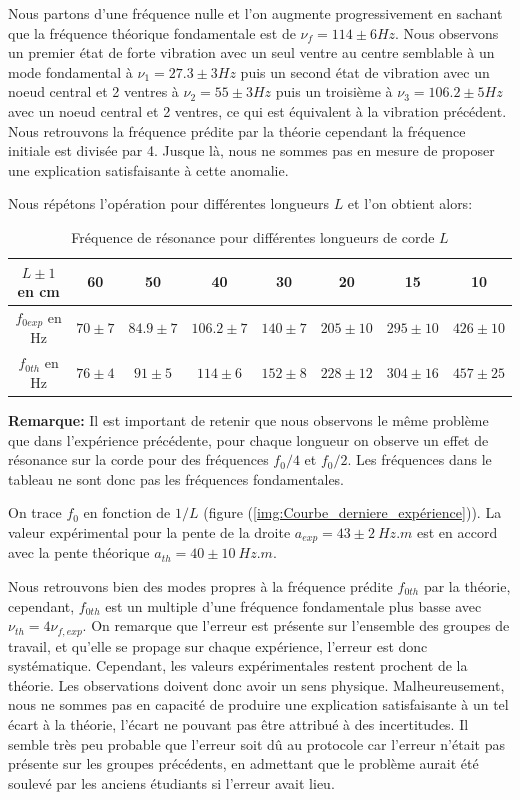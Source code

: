 \documentclass[11pt]{article}
\begin{document}
Nous partons d'une fréquence nulle et l'on augmente progressivement en sachant que la fréquence théorique fondamentale est de $\nu_f = 114 \pm 6 Hz$.
Nous observons un premier état de forte vibration avec un seul ventre au centre semblable à un mode fondamental à $\nu_1 = 27.3 \pm 3 Hz$ puis un second état 
de vibration avec un noeud central et 2 ventres à $\nu_2 = 55 \pm 3 Hz$ puis un troisième à $\nu_3 = 106.2 \pm 5Hz$ avec un noeud central et 2 ventres, ce qui est équivalent à la vibration
précédent. Nous retrouvons la fréquence prédite par la théorie cependant la fréquence initiale est divisée par 4. Jusque là, nous ne sommes pas en mesure de proposer une explication
satisfaisante à cette anomalie.

Nous répétons l'opération pour différentes longueurs $L$ et l'on obtient alors:

\begin{table}[h!]
	\centering
	\begin{tabular}{||c c c c c c c c||} 
		\hline
		$L \pm 1$ en cm & 60 & 50 & 40 & 30 & 20 & 15 & 10 \\
		\hline
        $f_{0exp}$ en Hz & $70 \pm 7$ & $84.9 \pm 7$ & $106.2 \pm 7$ & $140 \pm 7$ & $205 \pm 10$ & $295 \pm 10$ & $426 \pm 10$ \\
        $f_{0th}$ en Hz & $76 \pm 4$ & $91 \pm 5$ & $114 \pm 6$ & $152 \pm 8$ & $228 \pm 12$ & $304 \pm 16$ & $457 \pm 25$ \\
		\hline
	\end{tabular}
	\caption{Fréquence de résonance pour différentes longueurs de corde $L$}
	\label{table:2}
\end{table}

\textbf{Remarque:} Il est important de retenir que nous observons le même problème que dans l'expérience précédente, pour chaque longueur on observe un effet de résonance sur la corde
pour des fréquences $f_0/4$ et $f_0 / 2$. Les fréquences dans le tableau ne sont donc pas les fréquences fondamentales.

On trace $f_0$ en fonction de $1/L$ (figure (\ref{img:Courbe_derniere_expérience})). 
La valeur expérimental pour la pente de la droite $a_{exp}=43 \pm 2 \ Hz.m$ est en accord avec la pente théorique $a_{th}=40 \pm 10 \ Hz.m$.

Nous retrouvons bien des modes propres à la fréquence prédite $f_{0th}$ par la théorie, cependant, $f_{0th}$ est un multiple d'une fréquence fondamentale plus basse avec $\nu_{th} = 4 \nu_{f,exp}$.
On remarque que l'erreur est présente sur l'ensemble des groupes de travail, et qu'elle se propage sur chaque expérience, l'erreur est donc systématique. Cependant, les valeurs expérimentales restent prochent
de la théorie. Les observations doivent donc avoir un sens physique.
Malheureusement, nous ne sommes pas en capacité de produire une explication satisfaisante à un tel écart à la théorie, l'écart ne pouvant pas être attribué à des incertitudes. Il semble très peu probable
que l'erreur soit dû au protocole car l'erreur n'était pas présente sur les groupes précédents, en admettant que le problème aurait été soulevé par les anciens étudiants si l'erreur avait lieu.
\end{document}
